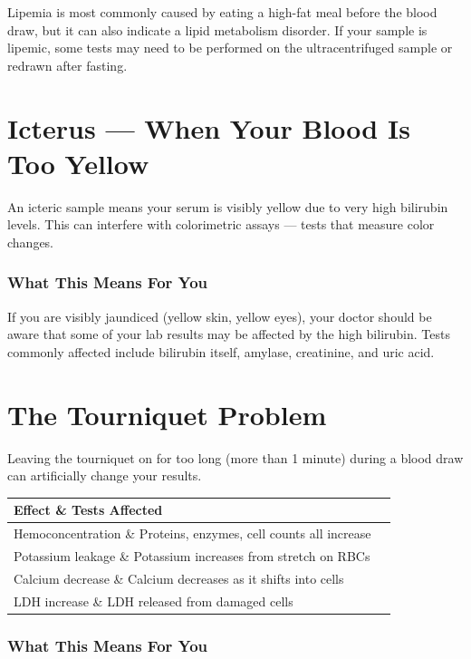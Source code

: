 Lipemia is most commonly caused by eating a high-fat meal before the blood draw, but it can also indicate a lipid metabolism disorder. If your sample is lipemic, some tests may need to be performed on the ultracentrifuged sample or redrawn after fasting.

\clearpage
\section{Icterus --- When Your Blood Is Too Yellow}

An icteric sample means your serum is visibly yellow due to very high bilirubin levels. This can interfere with colorimetric assays --- tests that measure color changes.

\subsubsection{What This Means For You}

If you are visibly jaundiced (yellow skin, yellow eyes), your doctor should be aware that some of your lab results may be affected by the high bilirubin. Tests commonly affected include bilirubin itself, amylase, creatinine, and uric acid.

\clearpage
\section{The Tourniquet Problem}

Leaving the tourniquet on for too long (more than 1 minute) during a blood draw can artificially change your results.

\begin{longtable}{@{}ll@{}}
\toprule
\textbf{Effect} \& \textbf{Tests Affected} \\
\midrule
Hemoconcentration \& Proteins, enzymes, cell counts all increase \\
Potassium leakage \& Potassium increases from stretch on RBCs \\
Calcium decrease \& Calcium decreases as it shifts into cells \\
LDH increase \& LDH released from damaged cells \\
\bottomrule
\end{longtable}

\subsubsection{What This Means For You}

